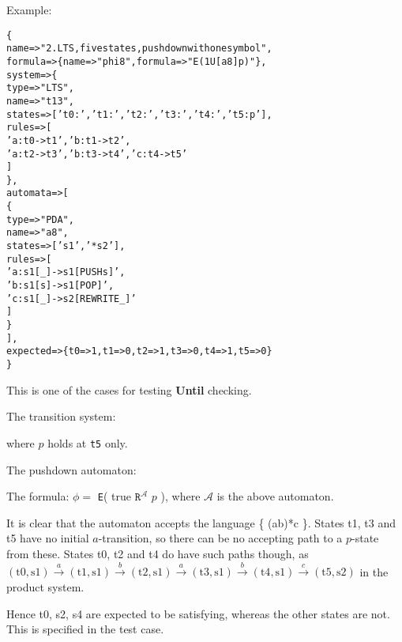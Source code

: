 \documentclass[11pt]{article}
\theoremstyle{definition}
\begin{document}
Example:
\begin{alltt}
\{
   name     => "2. LTS, five states, pushdown with one symbol",
   formula  => \{ name => "phi8", formula => "E( 1 U[a8] p )" \},
   system   => \{
      type => "LTS", 
      name => "t13", 
      states => ['t0 : ' ,'t1 : ' ,'t2 : ' ,'t3 : ' ,'t4 : ' ,'t5 : p'],
      rules => [ 
         'a:t0->t1' ,'b:t1->t2' ,
         'a:t2->t3' ,'b:t3->t4' ,'c:t4->t5'
      ]
   \},
   automata => [
      \{
         type => "PDA",
         name => "a8",
         states => [ 's1', '*s2' ],
         rules => [
            'a: s1[_] -> s1[PUSH s]',
            'b: s1[s] -> s1[POP]',
            'c: s1[_] -> s2[REWRITE _]'
         ]
      \}
   ],
   expected => \{ t0 => 1, t1 => 0, t2 => 1, t3 => 0, t4 => 1, t5 => 0\}
\}
\end{alltt}

This is one of the cases for testing \textbf{Until} checking.

The transition system:


where $p$ holds at \texttt{t5} only.

The pushdown automaton:


The formula: $\phi = $ \texttt{E}( true $\texttt{R}^{\mathcal{A}}$ $p$ ), where
$\mathcal{A}$ is the above automaton.

It is clear that the automaton accepts the language \{ (ab)*c \}. States t1, t3
and t5 have no initial $a$-transition, so there can be no accepting path to a
$p$-state from these. States t0, t2 and t4 do have such paths though, as
$(\text{t0}, \text{s1}) \xrightarrow{a} (\text{t1}, \text{s1}) \xrightarrow{b}
(\text{t2}, \text{s1}) \xrightarrow{a} (\text{t3}, \text{s1}) \xrightarrow{b}
(\text{t4}, \text{s1}) \xrightarrow{c} (\text{t5}, \text{s2})$ in the product
system.

Hence t0, s2, s4 are expected to be satisfying, whereas the other states are
not. This is specified in the test case.
\end{document}
